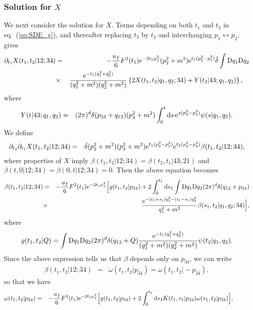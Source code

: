 \documentclass[preprint]{ptephy_v1}%
\newcommand{\rme}{{\rm e}}
\newcommand{\rmd}{{\rm d}}
\newcommand{\rmD}{{\rm D}}
\begin{document}
\subsubsection{Solution  for $X$}
We next consider the solution for $X$. Terms depending on both $t_1$ and  $t_3$ in eq.~(\ref{eq:SDE_g}),
 and thereafter replacing $t_3$ by $t_2$ and interchanging $p_1\leftrightarrow p_2$,
 gives
\begin{eqnarray}
\partial_{t_1} X(t_1,t_2\vert 12;34) &=& -\frac{u_f}{6}F^2(t_1) \rme^{-2t_1\mu_f^2}(p_2^2+m^2) \rme^{t_1(p_2^2-p_1^2)} \hat\delta \int \rmD q_1\rmD q_2
\nonumber \\
&\times& \frac{\rme^{-t_1(q_1^2+q_2^2)}}{(q_1^2+m^2)(q_2^2+m^2)} \left\{ 2 X(t_1,t_2\vert q_1,q_2;34) +Y(t_2\vert 43;q_1,q_2) \right\},~~~
\end{eqnarray}
where
\begin{eqnarray}
Y(t\vert 43;q_1,q_2) &=&  (2\pi)^d \delta(p_{34}+q_{12}) (p_3^2+m^2) \int_0^t \rmd s\, \rme^{s(p_3^2-p_4^3)}\psi(s\vert q_1,q_2) .
\end{eqnarray}
We define
\begin{eqnarray}
\partial_{t_2}\partial_{t_1} X(t_1,t_2\vert 12;34) &=& \hat\delta (p_2^2+m^2) (p_3^2+m^2) \rme^{t_1(p_2^2-p_1^2)} \rme^{t_2(p_3^2-p_4^2)} \beta(t_1,t_2\vert 12;34),
\end{eqnarray}
where properties  of $X$ imply $\beta (t_1,t_2\vert 12;34) =\beta(t_2,t_1\vert 43;21)$ and $\beta(t,0\vert 12;34) =\beta(0,t\vert 12;34)=0$. 
Then the above equation becomes
\begin{eqnarray}
\beta(t_1,t_2\vert 12;34) &=& -\frac{u_f}{6}F^2(t_1) \rme^{-2t_1 \mu_f^2}\Bigl[g(t_1,t_2\vert p_{34}) + 2
\int_0^{t_1} \rmd s_1 \int \rmD q_1 \rmD q_2 (2\pi)^d\delta(q_{12}+p_{34})\nonumber \\
&\times& \frac{\rme^{-(t_1+s_1)q_1^2 -(t_1-s_1)q_2^2}}{q_1^2+m^2}\beta(s_1,t_2\vert q_1,q_2;34)\Bigr],
\end{eqnarray}
where
\begin{eqnarray}
g(t_1,t_2 \vert Q) = \int \rmD q_1\rmD q_2(2\pi)^d\delta(q_{12}+Q)\frac{\rme^{-t_1(q_1^2+q_2^2)}}{(q_1^2+m^2)(q_2^2+m^2)} \psi(t_2\vert q_1,q_2) .
\end{eqnarray}
Since the above expression tells us that $\beta$  depends only on $p_{34}$, we can write
\begin{eqnarray}
\beta(t_1,t_2\vert 12;34) &=& \omega(t_1,t_2\vert p_{34})=\omega(t_1,t_2\vert -p_{34}),
\end{eqnarray}
so that we have
\begin{eqnarray}
\omega(t_1,t_2\vert p_{34}) &=& -\frac{u_f}{6}F^2(t_1)\rme^{-2t_1 \mu_f^2}\Bigl[g(t_1,t_2\vert p_{34}) + 2\int_0^{t_1} \rmd s_1 K(t_1,s_1\vert p_{34}) \omega(s_1,t_2\vert p_{34})\Bigr], ~~~~~~~~
\end{eqnarray}
\end{document}
